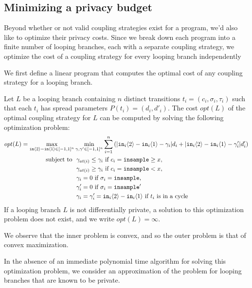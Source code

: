 
\subsection{Minimizing a privacy budget}

Beyond whether or not valid coupling strategies exist for a program, we'd also like to optimize their privacy costs. Since we break down each program into a finite number of looping branches, each with a separate coupling strategy, we optimize the cost of a coupling strategy for every looping branch independently

We first define a linear program that computes the optimal cost of any coupling strategy for a looping branch. 

\begin{prop}
    \label{prop:compute_opt_cost}
    Let $L$ be a looping branch containing $n$ distinct transitions $t_i = (c_i, \sigma_i, \tau_i)$ such that each $t_i$ has spread parameters $P(t_i) = (d_i, d'_i)$. The cost $opt(L)$ of the optimal coupling strategy for $L$ can be computed by solving the following optimization problem: 
    \begin{align*}
        opt(L) = \max_{\texttt{in}\langle2 \rangle-\texttt{in}\langle1 \rangle \in [-1, 1]^n} &\min_{\gamma, \gamma' \in [-1, 1]^n} \sum_{i = 1}^n \left(|\texttt{in}_i\langle2 \rangle-\texttt{in}_i\langle1 \rangle - \gamma_i| d_i + |\texttt{in}_i\langle2 \rangle-\texttt{in}_i\langle1 \rangle - \gamma_i'|d_i' \right)\\ 
            \text{subject to }
            &\ \gamma_{at(i)} \leq \gamma_i \text{ if } c_i = \texttt{insample}\geq x, \\
            &\ \gamma_{at(i)} \geq \gamma_i \text{ if } c_i = \texttt{insample} < x, \\
            &\ \gamma_i = 0 \text{ if } \sigma_i = \texttt{insample}, \\
            &\ \gamma_i' = 0 \text{ if } \sigma_i = \texttt{insample}'\\
            &\ \gamma_i = \gamma_i'= \texttt{in}_i\langle2 \rangle-\texttt{in}_i\langle1 \rangle \text{ if } t_i \text{ is in a cycle}
    \end{align*}
    If a looping branch $L$ is not differentially private, a solution to this optimization problem does not exist, and we write $opt(L) = \infty$.
\end{prop}

We observe that the inner problem is convex, and so the outer problem is that of convex maximization. 

In the absence of an immediate polynomial time algorithm for solving this optimization problem, we consider an approximation of the problem for looping branches that are known to be private. 


